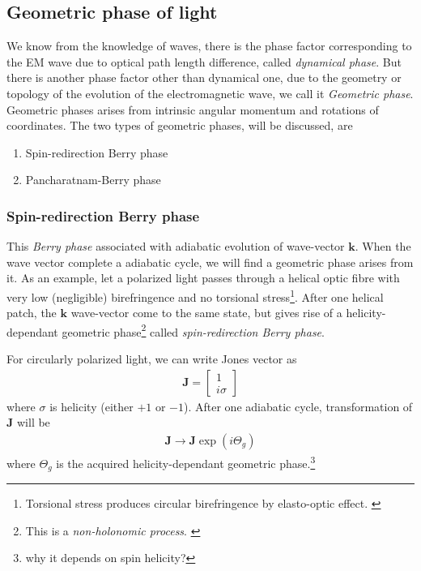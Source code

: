 \documentclass[11pt,a4paper]{article}
\numberwithin{equation}{section}
\begin{document}
\subsection{Geometric phase of light}
We know from the knowledge of waves, there is the phase factor corresponding to the EM wave due to optical path length difference, called \textit{dynamical phase}. But there is another phase factor other than dynamical one, due to the geometry or topology of the evolution of the electromagnetic wave, we call it \textit{Geometric phase}.\cite{WO} Geometric phases arises from intrinsic angular momentum and rotations of coordinates.\cite{bilokh 15} The two types of geometric phases, will be discussed, are
\begin{enumerate}
	\item Spin-redirection Berry phase
	\item Pancharatnam-Berry phase
\end{enumerate}

\subsubsection{Spin-redirection Berry phase}
This \textit{Berry phase} associated with adiabatic evolution of wave-vector $\boldsymbol{k}$. When the wave vector complete a adiabatic cycle, we will find a geometric phase arises from it.  As an example, let a polarized light passes through a helical optic fibre with very low (negligible) birefringence and no torsional stress\footnote{Torsional stress produces circular birefringence by elasto-optic effect. \cite{ross 84}}. After one helical patch, the $\boldsymbol{k}$ wave-vector come to the same state, but gives rise of a helicity-dependant geometric phase\footnote{This is a \textit{non-holonomic process}. \cite{anholonomy}} called \textit{spin-redirection Berry phase}. \cite{bilokh 15}

For circularly polarized light, we can write Jones vector as 
\begin{align}
	\boldsymbol{J} = 
	\begin{bmatrix}
		1\\i\sigma
	\end{bmatrix}
\end{align}
where  $\sigma$ is helicity (either $+1$ or $-1$). After one adiabatic cycle, transformation of $\boldsymbol{J}$ will be
\begin{align}
	\boldsymbol{J}\longrightarrow\boldsymbol{J}\exp(i\Theta_g)
\end{align} where $\Theta_g$ is the acquired helicity-dependant geometric phase.\footnote{why it depends on spin helicity?}
\end{document}
